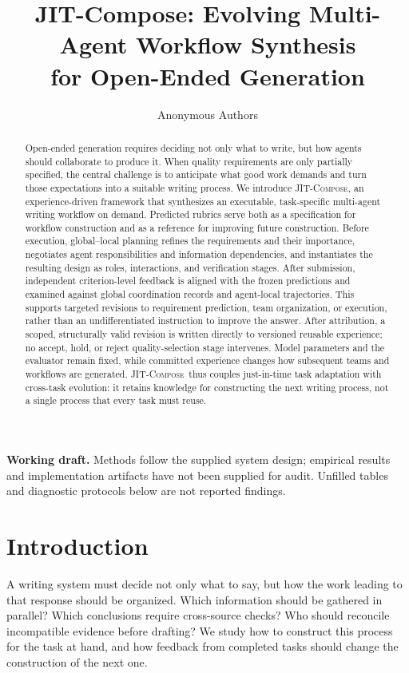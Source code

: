\documentclass[11pt]{article}
\title{JIT-Compose: Evolving Multi-Agent Workflow Synthesis\\for Open-Ended Generation}
\author{Anonymous Authors}
\date{}
\newcommand{\method}{\mbox{\textsc{JIT-Compose}}}
\begin{document}
\maketitle

\begin{abstract}
Open-ended generation requires deciding not only what to write, but how agents should collaborate to produce it. When quality requirements are only partially specified, the central challenge is to anticipate what good work demands and turn those expectations into a suitable writing process. We introduce \method, an experience-driven framework that synthesizes an executable, task-specific multi-agent writing workflow on demand. Predicted rubrics serve both as a specification for workflow construction and as a reference for improving future construction. Before execution, global--local planning refines the requirements and their importance, negotiates agent responsibilities and information dependencies, and instantiates the resulting design as roles, interactions, and verification stages. After submission, independent criterion-level feedback is aligned with the frozen predictions and examined against global coordination records and agent-local trajectories. This supports targeted revisions to requirement prediction, team organization, or execution, rather than an undifferentiated instruction to improve the answer. After attribution, a scoped, structurally valid revision is written directly to versioned reusable experience; no accept, hold, or reject quality-selection stage intervenes. Model parameters and the evaluator remain fixed, while committed experience changes how subsequent teams and workflows are generated. \method\ thus couples just-in-time task adaptation with cross-task evolution: it retains knowledge for constructing the next writing process, not a single process that every task must reuse.
\end{abstract}

\noindent\textbf{Working draft.} Methods follow the supplied system design; empirical results and implementation artifacts have not been supplied for audit. Unfilled tables and diagnostic protocols below are not reported findings.

\section{Introduction}
\label{sec:intro}

A writing system must decide not only what to say, but how the work leading to that response should be organized. Which information should be gathered in parallel? Which conclusions require cross-source checks? Who should reconcile incompatible evidence before drafting? We study how to construct this process for the task at hand, and how feedback from completed tasks should change the construction of the next one.
\end{document}
